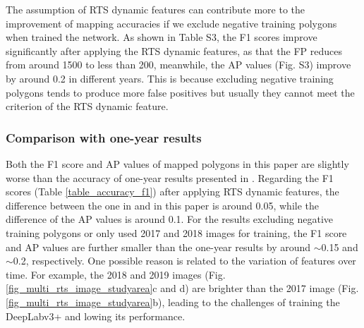 \documentclass[authoryear,preprint,review,12pt]{elsarticle}
\begin{document}
The assumption of RTS dynamic features can contribute more to the improvement of mapping accuracies if we exclude negative training polygons when trained the network. 
As shown in Table S3, the F1 scores improve significantly after applying the RTS dynamic features, as that the FP reduces from around 1500 to less than 200, meanwhile, the AP values (Fig. S3) improve by around 0.2 in different years. 
This is because excluding negative training polygons tends to produce more false positives but usually they cannot meet the criterion of the RTS dynamic feature.  



\subsubsection{Comparison with one-year results}
\label{sec_compare_with_201805_results}

Both the F1 score and AP values of mapped polygons in this paper are slightly worse than the accuracy of one-year results presented in \cite{huang2020using}. 
Regarding the F1 scores (Table \ref{table_accuracy_f1}) after applying RTS dynamic features, the difference between the one in \cite{huang2020using} and in this paper is around 0.05, while the difference of the AP values is around 0.1.
For the results excluding negative training polygons or only used 2017 and 2018 images for training, the F1 score and AP values are further smaller than the one-year results by around $\sim$0.15 and $\sim$0.2, respectively. 
One possible reason is related to the variation of features over time. 
For example, the 2018 and 2019 images (Fig. \ref{fig_multi_rts_image_studyarea}c and d) are brighter than the 2017 image (Fig. \ref{fig_multi_rts_image_studyarea}b), leading to the challenges of training the DeepLabv3+ and lowing its performance. %

\end{document}
